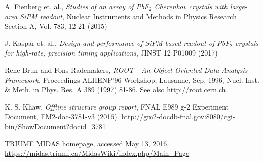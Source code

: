 \begin{thebibliography}{99}

A. Fienberg et. al.,
\emph{Studies of an array of PbF$_{2}$ Cherenkov crystals with large-area SiPM readout},
Nuclear Instruments and Methods in Physics Research Section A, Vol. 783, 12-21 (2015)

J. Kaspar et. al.,
\emph{Design and performance of SiPM-based readout of PbF$_{2}$ crystals for high-rate, precision timing applications},
JINST 12 P01009 (2017)

Rene Brun and Fons Rademakers, 
\emph{ROOT - An Object Oriented Data Analysis Framework},
Proceedings ALHENP'96 Workshop, Lausanne, Sep. 1996, Nucl. Inst. \& Meth. in Phys. Res. A 389 (1997) 81-86. See also \url{http://root.cern.ch}.

K. S. Khaw,
\emph{Offline structure group report},
FNAL E989 g-2 Experiment Document, FM2-doc-3781-v3 (2016). \url{http://gm2-docdb-fnal.gov:8080/cgi-bin/ShowDocument?docid=3781}

TRIUMF MIDAS homepage, accessed May 13, 2016. 
\url{https://midas.triumf.ca/MidasWiki/index.php/Main_Page}

\end{thebibliography}
